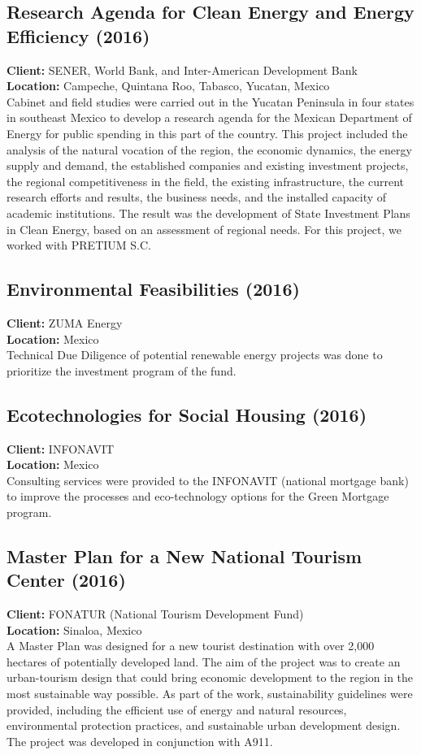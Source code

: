 \documentclass[
	a4paper,
	12pt,
	unnumberedsections,
]{CSSullivanBusinessReport}
\begin{document}
\subsection{Research Agenda for Clean Energy and Energy Efficiency (2016)}
\textbf{Client:}  SENER, World Bank, and Inter-American Development Bank \\
\textbf{Location:}  Campeche, Quintana Roo, Tabasco, Yucatan, Mexico \\[0.5em]
 Cabinet and field studies were carried out in the Yucatan Peninsula in four states in southeast Mexico to develop a research agenda for the Mexican Department of Energy for public spending in this part of the country. This project included the analysis of the natural vocation of the region, the economic dynamics, the energy supply and demand, the established companies and existing investment projects, the regional competitiveness in the field, the existing infrastructure, the current research efforts and results, the business needs, and the installed capacity of academic institutions. The result was the development of State Investment Plans in Clean Energy, based on an assessment of regional needs. For this project, we worked with PRETIUM S.C.

\subsection{Environmental Feasibilities (2016)}
\textbf{Client:}  ZUMA Energy \\
\textbf{Location:}  Mexico	 \\[0.5em]
 Technical Due Diligence of potential renewable energy projects was done to prioritize the investment program of the fund.

\subsection{Ecotechnologies for Social Housing (2016)}
\textbf{Client:}  INFONAVIT \\
\textbf{Location:}  Mexico	 \\[0.5em]
 Consulting services were provided to the INFONAVIT (national mortgage bank) to improve the processes and eco-technology options for the Green Mortgage program.

\subsection{Master Plan for a New National Tourism Center (2016)}
\textbf{Client:}  FONATUR (National Tourism Development Fund) \\
\textbf{Location:}  Sinaloa, Mexico	 \\[0.5em]
 A Master Plan was designed for a new tourist destination with over 2,000 hectares of potentially developed land. The aim of the project was to create an urban-tourism design that could bring economic development to the region in the most sustainable way possible. As part of the work, sustainability guidelines were provided, including the efficient use of energy and natural resources, environmental protection practices, and sustainable urban development design. The project was developed in conjunction with A911.
\end{document}
